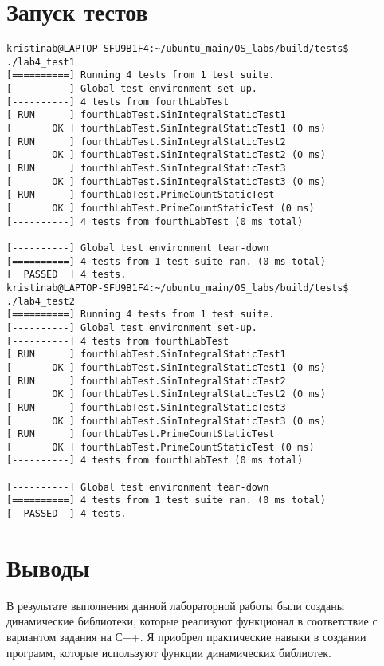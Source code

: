\documentclass[a4paper, 12pt]{article}
\begin{document}
\section{Запуск тестов}
\begin{verbatim}
kristinab@LAPTOP-SFU9B1F4:~/ubuntu_main/OS_labs/build/tests$ ./lab4_test1
[==========] Running 4 tests from 1 test suite.
[----------] Global test environment set-up.
[----------] 4 tests from fourthLabTest
[ RUN      ] fourthLabTest.SinIntegralStaticTest1
[       OK ] fourthLabTest.SinIntegralStaticTest1 (0 ms)
[ RUN      ] fourthLabTest.SinIntegralStaticTest2
[       OK ] fourthLabTest.SinIntegralStaticTest2 (0 ms)
[ RUN      ] fourthLabTest.SinIntegralStaticTest3
[       OK ] fourthLabTest.SinIntegralStaticTest3 (0 ms)
[ RUN      ] fourthLabTest.PrimeCountStaticTest
[       OK ] fourthLabTest.PrimeCountStaticTest (0 ms)
[----------] 4 tests from fourthLabTest (0 ms total)

[----------] Global test environment tear-down
[==========] 4 tests from 1 test suite ran. (0 ms total)
[  PASSED  ] 4 tests.
kristinab@LAPTOP-SFU9B1F4:~/ubuntu_main/OS_labs/build/tests$ ./lab4_test2
[==========] Running 4 tests from 1 test suite.
[----------] Global test environment set-up.
[----------] 4 tests from fourthLabTest
[ RUN      ] fourthLabTest.SinIntegralStaticTest1
[       OK ] fourthLabTest.SinIntegralStaticTest1 (0 ms)
[ RUN      ] fourthLabTest.SinIntegralStaticTest2
[       OK ] fourthLabTest.SinIntegralStaticTest2 (0 ms)
[ RUN      ] fourthLabTest.SinIntegralStaticTest3
[       OK ] fourthLabTest.SinIntegralStaticTest3 (0 ms)
[ RUN      ] fourthLabTest.PrimeCountStaticTest
[       OK ] fourthLabTest.PrimeCountStaticTest (0 ms)
[----------] 4 tests from fourthLabTest (0 ms total)

[----------] Global test environment tear-down
[==========] 4 tests from 1 test suite ran. (0 ms total)
[  PASSED  ] 4 tests.
\end{verbatim}
\newpage

\section{Выводы}

В результате выполнения данной лабораторной работы были созданы динамические библиотеки, которые реализуют функционал в соответствие с вариантом задания на С++. Я приобрел практические навыки в создании программ, которые используют функции динамических библиотек.
\end{document}
